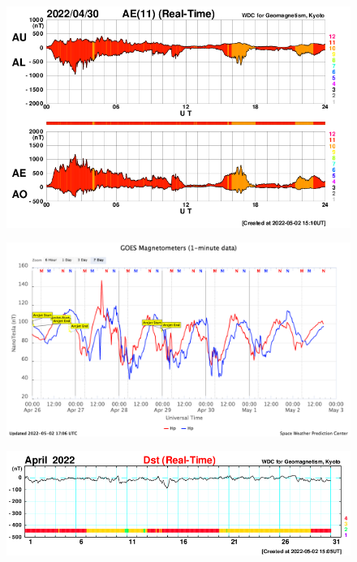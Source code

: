 \documentclass[11pt, oneside]{article}
\begin{document}
                     \begin{figure}[H]
    
                        \centering
   
                             \includegraphics[width=14cm]{./figures//figureGeomag_3.png}

                        \end{figure}

                     \begin{figure}[H]
    
                        \centering
   
                             \includegraphics[width=14cm]{./figures//figureGeomag_4.png}

                        \end{figure}

                     \begin{figure}[H]
    
                        \centering
   
                             \includegraphics[width=14cm]{./figures//figureGeomag_5.png}

                        \end{figure}
\end{document}
